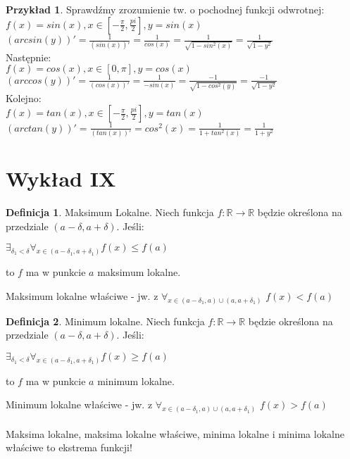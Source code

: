 \documentclass{article}
\theoremstyle{definition}
\newtheorem{de}{Definicja}[subsection]
\theoremstyle{definition}
\theoremstyle{definition}
\newtheorem{pk}{Przykład}[subsection]
\theoremstyle{definition}
\begin{document}
\begin{pk}
    Sprawdźmy zrozumienie tw. o pochodnej funkcji odwrotnej:\\
    $f(x)=sin(x), x\in[-\frac{\pi}{2},\frac{pi}{2}], y=sin(x)$\\
    $\left(arcsin(y)\right)'=\frac{1}{(sin(x))'} = \frac{1}{cos(x)}=\frac{1}{\sqrt{1-sin^2(x)}}=\frac{1}{\sqrt{1-y^2}}$\\
    Następnie:\\
    $f(x)=cos(x), x\in[0,\pi], y=cos(x)$\\
    $\left(arccos(y)\right)'=\frac{1}{(cos(x))'} = \frac{1}{-sin(x)} = \frac{-1}{\sqrt{1-cos^2(y)}}=\frac{-1}{\sqrt{1-y^2}}$\\
    Kolejno:\\
    $f(x)=tan(x), x\in[-\frac{\pi}{2},\frac{pi}{2}], y=tan(x)$\\
    $\left(arctan(y)\right)'=\frac{1}{(tan(x))'}=cos^2(x)=\frac{1}{1+tan^2(x)}=\frac{1}{1+y^2}$
\end{pk}

\section{Wykład IX}

\begin{de}
    Maksimum Lokalne. Niech funkcja $f:\mathbb{R}\rightarrow\mathbb{R}$ będzie określona na przedziale $(a-\delta,a+\delta)$.
    Jeśli:
    \begin{center}
        $\exists_{\delta_1 < \delta} \forall_{x\in(a-\delta_1,a + \delta_1)} f(x)\leq f(a)$
    \end{center} to $f$  ma w punkcie $a$ maksimum lokalne.
    \end{de}
    Maksimum lokalne właściwe - jw. z $\forall_{x\in (a-\delta_1, a)\cup(a,a+\delta_1)}$ $f(x)<f(a)$
    
    \begin{de}
    Minimum lokalne. Niech funkcja $f:\mathbb{R}\rightarrow\mathbb{R}$ będzie określona na przedziale $(a-\delta,a+\delta)$.
    Jeśli:
    \begin{center}
        $\exists_{\delta_1 < \delta} \forall_{x\in(a-\delta_1,a + \delta_1)} f(x)\geq f(a)$
    \end{center} to $f$  ma w punkcie $a$ minimum lokalne.
    \end{de}
    Minimum lokalne właściwe - jw. z $\forall_{x\in (a-\delta_1, a)\cup(a,a+\delta_1)}$ $f(x)>f(a)$\\\\
    Maksima lokalne, maksima lokalne właściwe, minima lokalne i minima lokalne właściwe to ekstrema funkcji!
    
\end{document}
